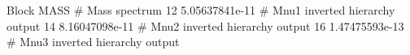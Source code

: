 Block MASS                      # Mass spectrum
        12     5.05637841e-11   # Mnu1 inverted hierarchy output
        14     8.16047098e-11   # Mnu2 inverted hierarchy output
        16     1.47475593e-13   # Mnu3 inverted hierarchy output
